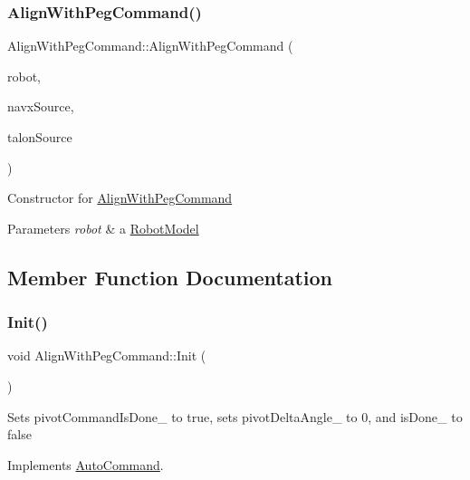 \subsubsection{\texorpdfstring{Align\+With\+Peg\+Command()}{AlignWithPegCommand()}}
{\footnotesize\ttfamily Align\+With\+Peg\+Command\+::\+Align\+With\+Peg\+Command (\begin{DoxyParamCaption}\item[{\hyperlink{class_robot_model}{Robot\+Model} $\ast$}]{robot,  }\item[{\hyperlink{class_navx_p_i_d_source}{Navx\+P\+I\+D\+Source} $\ast$}]{navx\+Source,  }\item[{\hyperlink{class_talon_encoder_p_i_d_source}{Talon\+Encoder\+P\+I\+D\+Source} $\ast$}]{talon\+Source }\end{DoxyParamCaption})}

Constructor for \hyperlink{class_align_with_peg_command}{Align\+With\+Peg\+Command} 
\begin{DoxyParams}{Parameters}
{\em robot} & a \hyperlink{class_robot_model}{Robot\+Model} \\
\hline
\end{DoxyParams}


\subsection{Member Function Documentation}
\mbox{\label{class_align_with_peg_command_aec3a26a2f33ac872b551f8ae0e69016e}} 
\subsubsection{\texorpdfstring{Init()}{Init()}}
{\footnotesize\ttfamily void Align\+With\+Peg\+Command\+::\+Init (\begin{DoxyParamCaption}{ }\end{DoxyParamCaption})\hspace{0.3cm}{\ttfamily [virtual]}}

Sets pivot\+Command\+Is\+Done\+\_\+ to true, sets pivot\+Delta\+Angle\+\_\+ to 0, and is\+Done\+\_\+ to false 

Implements \hyperlink{class_auto_command}{Auto\+Command}.

\mbox{\label{class_align_with_peg_command_a718e94b95fb192cf1e770e8af32dc616}} 

